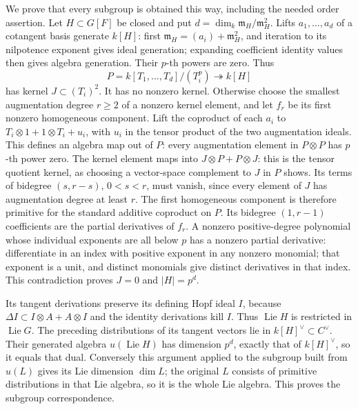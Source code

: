 \documentclass[11pt,a4paper,openany]{report}
\begin{document}
We prove that every subgroup is obtained this way, including the needed order assertion. Let \(H\subset G[F]\) be closed and put \(d=\dim_k\mathfrak m_H/\mathfrak m_H^2\). Lifts \(a_1,\ldots,a_d\) of a cotangent basis generate \(k[H]\): first \(\mathfrak m_H=(a_i)+\mathfrak m_H^2\), and iteration to its nilpotence exponent gives ideal generation; expanding coefficient identity values then gives algebra generation. Their \(p\)-th powers are zero. Thus \[
 P=k[T_1,\ldots,T_d]/(T_i^p)\twoheadrightarrow k[H]
\] has kernel \(J\subset (T_i)^2\). It has no nonzero kernel. Otherwise choose the smallest augmentation degree \(r\ge2\) of a nonzero kernel element, and let \(f_r\) be its first nonzero homogeneous component. Lift the coproduct of each \(a_i\) to \(T_i\otimes1+1\otimes T_i+u_i\), with \(u_i\) in the tensor product of the two augmentation ideals. This defines an algebra map out of \(P\): every augmentation element in \(P\otimes P\) has \(p\)-th power zero. The kernel element maps into \(J\otimes P+P\otimes J\): this is the tensor quotient kernel, as choosing a vector-space complement to \(J\) in \(P\) shows. Its terms of bidegree \((s,r-s)\), \(0<s<r\), must vanish, since every element of \(J\) has augmentation degree at least \(r\). The first homogeneous component is therefore primitive for the standard additive coproduct on \(P\). Its bidegree \((1,r-1)\) coefficients are the partial derivatives of \(f_r\). A nonzero positive-degree polynomial whose individual exponents are all below \(p\) has a nonzero partial derivative: differentiate in an index with positive exponent in any nonzero monomial; that exponent is a unit, and distinct monomials give distinct derivatives in that index. This contradiction proves \(J=0\) and \(|H|=p^d\).

Its tangent derivations preserve its defining Hopf ideal \(I\), because \(\Delta I\subset I\otimes A+A\otimes I\) and the identity derivations kill \(I\). Thus \(\operatorname{Lie}H\) is restricted in \(\operatorname{Lie}G\). The preceding distributions of its tangent vectors lie in \(k[H]^\vee\subset C^\vee\). Their generated algebra \(u(\operatorname{Lie}H)\) has dimension \(p^d\), exactly that of \(k[H]^\vee\), so it equals that dual. Conversely this argument applied to the subgroup built from \(u(L)\) gives its Lie dimension \(\dim L\); the original \(L\) consists of primitive distributions in that Lie algebra, so it is the whole Lie algebra. This proves the subgroup correspondence.
\end{document}
